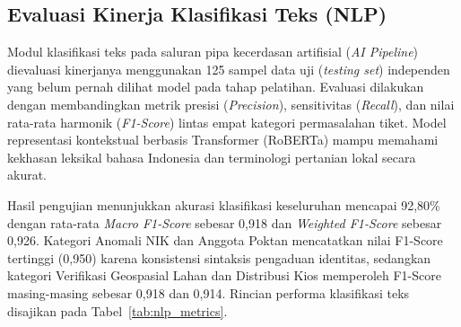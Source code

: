 ﻿\documentclass[conference]{IEEEtran}
\begin{document}
\subsection{Evaluasi Kinerja Klasifikasi Teks (NLP)}
Modul klasifikasi teks pada saluran pipa kecerdasan artifisial (\textit{AI Pipeline}) dievaluasi kinerjanya menggunakan 125 sampel data uji (\textit{testing set}) independen yang belum pernah dilihat model pada tahap pelatihan. Evaluasi dilakukan dengan membandingkan metrik presisi (\textit{Precision}), sensitivitas (\textit{Recall}), dan nilai rata-rata harmonik (\textit{F1-Score}) lintas empat kategori permasalahan tiket. Model representasi kontekstual berbasis Transformer (RoBERTa) mampu memahami kekhasan leksikal bahasa Indonesia dan terminologi pertanian lokal secara akurat.

Hasil pengujian menunjukkan akurasi klasifikasi keseluruhan mencapai 92,80\% dengan rata-rata \textit{Macro F1-Score} sebesar 0,918 dan \textit{Weighted F1-Score} sebesar 0,926. Kategori Anomali NIK dan Anggota Poktan mencatatkan nilai F1-Score tertinggi (0,950) karena konsistensi sintaksis pengaduan identitas, sedangkan kategori Verifikasi Geospasial Lahan dan Distribusi Kios memperoleh F1-Score masing-masing sebesar 0,918 dan 0,914. Rincian performa klasifikasi teks disajikan pada Tabel~\ref{tab:nlp_metrics}.

\begin{table}[htbp]
\caption{Metrik Kinerja Evaluasi Klasifikasi Teks (NLP)}
\begin{center}
\label{tab:nlp_metrics}
\end{center}
\end{table}
\end{document}
